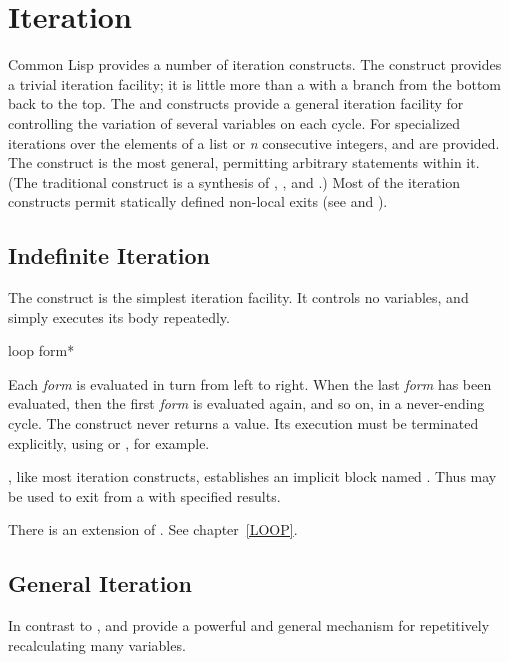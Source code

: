 \section{Iteration}

Common Lisp provides a number of iteration constructs.  The 
construct provides a trivial iteration facility; it is little more
than a  with a branch from the bottom back to the top.
The 
and  constructs provide a general iteration facility
for controlling the variation of several variables on each cycle.
For specialized iterations
over the elements of a list or \emph{n} consecutive integers,  and
 are provided.  The  construct is the most
general, permitting arbitrary  statements within it.  (The
traditional  construct is a synthesis of ,
, and .)
Most of the iteration constructs permit statically defined non-local exits
(see  and ).

\subsection{Indefinite Iteration}

The  construct is the simplest iteration facility.
It controls no variables, and simply executes its body repeatedly.

\begin{defmac}
loop {form}*

Each \emph{form} is evaluated in turn from left to right.
When the last \emph{form} has been evaluated, then the first \emph{form}
is evaluated again, and so on, in a never-ending cycle.
The  construct never returns a value.  Its execution must be terminated
explicitly, using  or , for example.

, like most iteration constructs,
establishes an implicit block named {\nil}.
Thus  may be used to exit from a  with specified results.

There is an extension of .  See chapter~\ref{LOOP}.
\end{defmac}


\subsection{General Iteration}

In contrast to ,  and  provide a powerful
and general mechanism for repetitively recalculating many variables.

